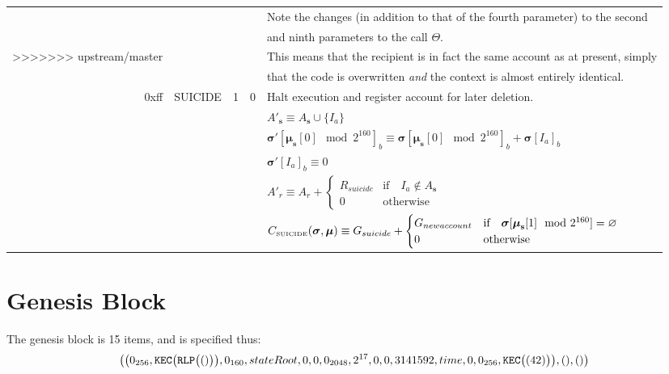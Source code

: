 \documentclass[9pt,oneside]{amsart}
\begin{document}
\begin{tabular*}{\columnwidth}[h]{rlrrl}
&&&& Note the changes (in addition to that of the fourth parameter) to the second \\
&&&& and ninth parameters to the call $\Theta$.\\
>>>>>>> upstream/master
&&&& This means that the recipient is in fact the same account as at present, simply\\
&&&& that the code is overwritten {\it and} the context is almost entirely identical.\\
\midrule
0xff & {\small SUICIDE} & 1 & 0 & Halt execution and register account for later deletion. \\
&&&& $A'_\mathbf{s} \equiv A_\mathbf{s} \cup \{ I_a \}$ \\
&&&& $\boldsymbol{\sigma}'[\boldsymbol{\mu}_\mathbf{s}[0] \mod 2^{160}]_b \equiv \boldsymbol{\sigma}[\boldsymbol{\mu}_\mathbf{s}[0] \mod 2^{160}]_b + \boldsymbol{\sigma}[I_a]_b$ \\
&&&& $\boldsymbol{\sigma}'[I_a]_b \equiv 0$ \\
&&&& $A'_{r} \equiv A_{r} + \begin{cases}
R_{suicide} & \text{if} \quad I_a \notin A_\mathbf{s} \\
0 & \text{otherwise}
\end{cases}$ \\
&&&& $C_{\text{\tiny SUICIDE}}(\boldsymbol{\sigma}, \boldsymbol{\mu}) \equiv G_{suicide} + \begin{cases}
G_{newaccount} & \text{if} \quad \boldsymbol{\sigma}[\boldsymbol{\mu}_\mathbf{s}[1] \mod 2^{160}] = \varnothing \\
0 & \text{otherwise}
\end{cases}$ \\
\bottomrule
\end{tabular*}


\section{Genesis Block}\label{app:genesis}

The genesis block is 15 items, and is specified thus:
\begin{equation}
\big( \big( 0_{256}, \mathtt{\tiny KEC}\big(\mathtt{\tiny RLP}\big( () \big)\big), 0_{160}, stateRoot, 0, 0, 0_{2048}, 2^{17}, 0, 0, 3141592, time, 0, 0_{256},  \mathtt{\tiny KEC}\big( (42) \big) \big), (), () \big)
\end{equation}
\end{document}
